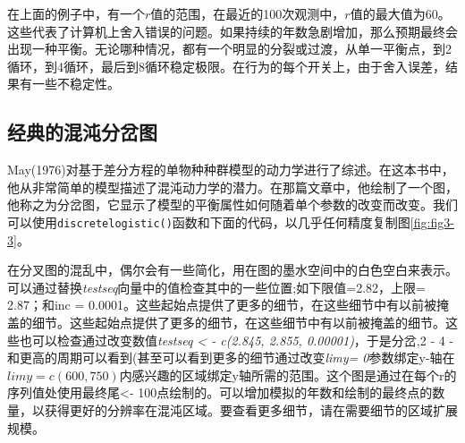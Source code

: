 \documentclass[
  lang=cn,
  11pt,
  scheme=chinese,
  chinesefont=nofont,
  citestyle=gb7714-2015,
  bibstyle=gb7714-2015]{elegantbook}
\begin{document}
在上面的例子中，有一个\(r\)值的范围，在最近的100次观测中，\(r\)值的最大值为60。这些代表了计算机上舍入错误的问题。如果持续的年数急剧增加，那么预期最终会出现一种平衡。无论哪种情况，都有一个明显的分裂或过渡，从单一平衡点，到2循环，到4循环，最后到8循环稳定极限。在行为的每个开关上，由于舍入误差，结果有一些不稳定性。

\subsection{经典的混沌分岔图}\label{ux7ecfux5178ux7684ux6df7ux6c8cux5206ux5c94ux56fe}

May(1976)对基于差分方程的单物种种群模型的动力学进行了综述。在这本书中，他从非常简单的模型描述了混沌动力学的潜力。在那篇文章中，他绘制了一个图，他称之为分岔图，它显示了模型的平衡属性如何随着单个参数的改变而改变。我们可以使用\texttt{discretelogistic()}函数和下面的代码，以几乎任何精度复制图\ref{fig:fig3-3}。

在分叉图的混乱中，偶尔会有一些简化，用在图的墨水空间中的白色空白来表示。可以通过替换\emph{testseq}向量中的值检查其中的一些位置;如下限值=2.82，上限= 2.87；和inc = 0.0001。这些起始点提供了更多的细节，在这些细节中有以前被掩盖的细节。这些起始点提供了更多的细节，在这些细节中有以前被掩盖的细节。这些也可以检查通过改变数值\emph{testseq \textless{} - c(2.845, 2.855, 0.00001)}，于是分岔,2 - 4 -和更高的周期可以看到(甚至可以看到更多的细节通过改变\emph{limy= 0}参数绑定y-轴在\(limy=c(600, 750)\)内感兴趣的区域绑定y轴所需的范围。这个图是通过在每个r的序列值处使用最终尾\textless- 100点绘制的。可以增加模拟的年数和绘制的最终点的数量，以获得更好的分辨率在混沌区域。要查看更多细节，请在需要细节的区域扩展规模。
\end{document}
